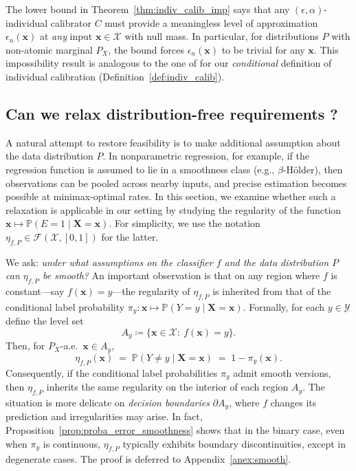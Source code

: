 \documentclass{article}
\theoremstyle{plain}
\theoremstyle{definition}
\theoremstyle{remark}
\begin{document}
The lower bound in Theorem~\ref{thm:indiv_calib_imp} says that any $(\epsilon,\alpha)$-individual calibrator $C$ must provide a meaningless level of approximation $\epsilon_n(\mathbf{x})$ at \textit{any} input $\mathbf{x} \in \mathcal{X}$ with null mass. In particular, for distributions $P$ with non-atomic marginal $P_X$, the bound forces $\epsilon_n(\mathbf{x})$ to be trivial for any $\mathbf{x}$. This impossibility result is analogous to the one of \citep{rina2020inference} for our \textit{conditional} definition of individual calibration (Definition~\ref{def:indiv_calib}).

\subsection{Can we relax distribution-free requirements ?}
\label{sec:smooth_relaxation}

A natural attempt to restore feasibility is to make additional assumption about the data distribution $P$. In nonparametric regression, for example, if the regression function is assumed to lie in a smoothness class (e.g., \(\beta\)-Hölder),
then observations can be pooled across nearby inputs, and precise estimation becomes possible at minimax-optimal rates.
In this section, we examine whether such a relaxation is applicable in our setting by studying the regularity of the function $\mathbf{x} \mapsto \mathbb{P}(E=1 \mid \mathbf{X} = \mathbf{x})$. For simplicity, we use the notation $\eta_{f,P} \in \mathcal{F}(\mathcal{X}, [0,1])$ for the latter.

We ask: \emph{under what assumptions on the classifier \(f\) and the data distribution \(P\) can \(\eta_{f,P}\) be smooth?}
An important observation is that on any region where \(f\) is constant---say \(f(\mathbf{x})=y\)---the regularity of \(\eta_{f,P}\)
is inherited from that of the conditional label probability \(\pi_y :\mathbf{x}\mapsto \mathbb{P}(Y=y\mid \mathbf{X}=\mathbf{x})\).
Formally, for each \(y\in\mathcal Y\) define the level set
\[
A_y \coloneqq \{\mathbf{x} \in\mathcal X:\ f(\mathbf{\mathbf{x}})=y\}.
\]
Then, for \(P_X\)-a.e.\ \(\mathbf{x}\in A_y\),
\[
\eta_{f,P}(\mathbf{x}) \;=\; \mathbb{P}(Y\neq y \mid \mathbf{X}=\mathbf{x})
\;=\; 1 - \pi_y(\mathbf{x}).
\]
Consequently, if the conditional label probabilities $\pi_y$ admit smooth versions,
then \(\eta_{f,P}\) inherits the same regularity on the interior of each region \(A_y\).
The situation is more delicate on \emph{decision boundaries} \(\partial A_y\), where \(f\) changes its prediction and
irregularities may arise. In fact, Proposition~\ref{prop:proba_error_smoothness} shows that in the binary case,
even when $\pi_y$ is continuous, \(\eta_{f,P}\) typically exhibits boundary discontinuities, except in
degenerate cases. The proof is deferred to Appendix~\ref{anex:smooth}.
\end{document}
